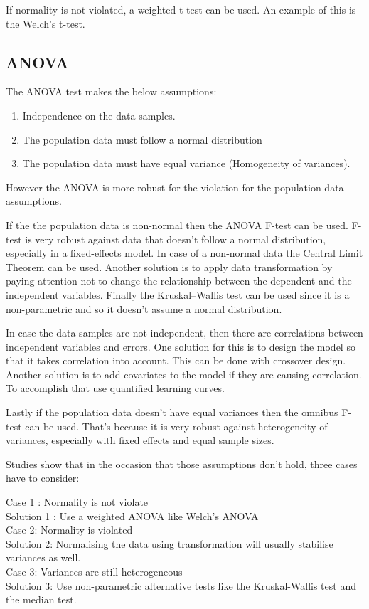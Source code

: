 \documentclass[a4paper,11pt]{article}
\begin{document}
If normality is not violated, a weighted t-test can be used. An example of
this is the  Welch's t-test.

\subsection{ANOVA}
The ANOVA test makes the below assumptions:

\begin{enumerate}
\item Independence on the data samples.
\item The population data must follow a normal distribution
\item The population data must have equal variance (Homogeneity of variances).
\end{enumerate}

However the ANOVA is more robust for the violation for the population data
assumptions. 

If the the population data is non-normal then the ANOVA F-test can be used.
F-test is very robust against data that doesn't follow a normal distribution,
especially in a fixed-effects model. In case of a non-normal data the Central
Limit Theorem can be used. Another solution is to apply data transformation by
paying attention not to change the relationship between the dependent and the
independent variables. Finally the Kruskal–Wallis test  can be used since it is
a non-parametric and so it doesn't assume a normal distribution.

In case the data samples are not independent, then there are correlations
between independent variables and errors. One solution for this is to design
the model so that it takes correlation into account. This can be done with
crossover design. Another solution is to add covariates to the model if they
are causing correlation. To accomplish that use quantified learning curves.

Lastly if the population data doesn't have equal variances then the omnibus
F-test can be used. That's because it is very robust against heterogeneity of
variances, especially with fixed effects and equal sample sizes.

Studies show that in the occasion that those assumptions don’t hold, three
cases have to consider:

Case 1 : Normality is not violate\\
Solution 1 : Use a weighted ANOVA like Welch's ANOVA\\

Case 2: Normality is violated\\
Solution 2: Normalising the data using transformation will usually stabilise
variances as well.\\

Case 3: Variances are still heterogeneous\\
Solution 3: Use non-parametric alternative tests like the Kruskal-Wallis test
and the median test.\\
\end{document}
